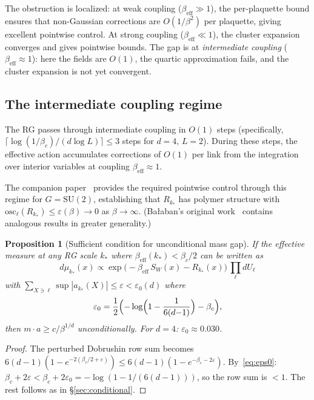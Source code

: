 \documentclass[11pt,a4paper]{article}
\theoremstyle{plain}
\newtheorem{proposition}[theorem]{Proposition}
\theoremstyle{definition}
\theoremstyle{remark}
\newcommand{\SU}{\mathrm{SU}}
\newcommand{\osc}{\mathrm{osc}}
\begin{document}
The obstruction is localized: at weak coupling
($\beta_{\mathrm{eff}} \gg 1$), the per-plaquette bound
ensures that non-Gaussian corrections are $O(1/\beta^2)$
per plaquette, giving excellent pointwise control.
At strong coupling ($\beta_{\mathrm{eff}} \ll 1$), the
cluster expansion converges and gives pointwise bounds.
The gap is at \emph{intermediate coupling}
($\beta_{\mathrm{eff}} \approx 1$): here the fields are
$O(1)$, the quartic approximation fails, and the cluster
expansion is not yet convergent.

\subsection{The intermediate coupling regime}

The RG passes through intermediate coupling in
$O(1)$ steps (specifically, $\lceil \log(1/\beta_c) /
(d\log L)\rceil \leq 3$ steps for $d = 4$, $L = 2$).
During these steps, the effective action accumulates
corrections of $O(1)$ per link from the integration over
interior variables at coupling $\beta_{\mathrm{eff}} \approx 1$.

The companion paper~\cite{FontesSU2} provides
the required pointwise control through this regime for
$G = \SU(2)$,
establishing that $R_{k_*}$ has polymer structure with
$\osc_\ell(R_{k_*}) \leq \varepsilon(\beta) \to 0$
as $\beta \to \infty$.
(Ba{\l}aban's original
work~\cite{Balaban85,Balaban89} contains analogous
results in greater generality.)

\begin{proposition}[Sufficient condition for unconditional
mass gap]\label{prop:sufficient}
If the effective measure at any RG scale $k_*$ where
$\beta_{\mathrm{eff}}(k_*) < \beta_c/2$ can be written as
\begin{equation}
  d\mu_{k_*}(x) \propto \exp\!\bigl(-\beta_{\mathrm{eff}}
  \,S_W(x) - R_{k_*}(x)\bigr)\,\prod_\ell dU_\ell
\end{equation}
with $\sum_{X \ni \ell} \sup |a_{k_*}(X)|
\leq \varepsilon < \varepsilon_0(d)$ where
\begin{equation}\label{eq:eps0}
  \varepsilon_0 = \frac{1}{2}\Bigl(
  -\log\Bigl(1 - \frac{1}{6(d{-}1)}\Bigr) - \beta_c\Bigr),
\end{equation}
then $m \cdot a \geq c / \beta^{1/d}$ unconditionally.
For $d = 4$: $\varepsilon_0 \approx 0.030$.
\end{proposition}

\begin{proof}
The perturbed Dobrushin row sum becomes
$6(d{-}1)(1 - e^{-2(\beta_c/2 + \varepsilon)})
\leq 6(d{-}1)(1 - e^{-\beta_c - 2\varepsilon})$.
By~\eqref{eq:eps0}:
$\beta_c + 2\varepsilon < \beta_c + 2\varepsilon_0
= -\log(1 - 1/(6(d{-}1)))$,
so the row sum is $< 1$.  The rest follows as in
\S\ref{sec:conditional}.
\end{proof}
\end{document}
